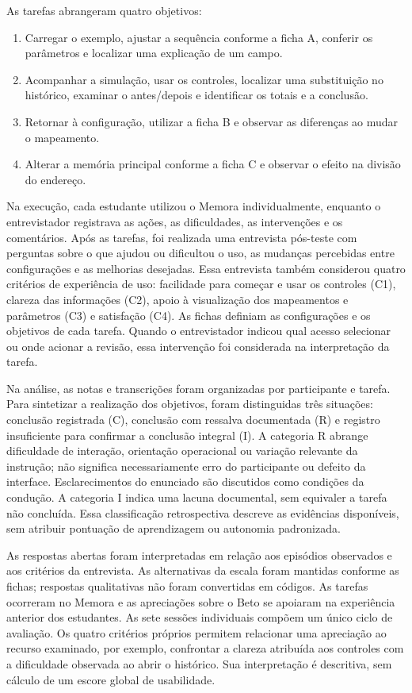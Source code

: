 As tarefas abrangeram quatro objetivos:
\begin{enumerate}
\item[\textbf{T1.}] Carregar o exemplo, ajustar a sequência conforme a ficha A, conferir os parâmetros e localizar uma explicação de um campo.
\item[\textbf{T2.}] Acompanhar a simulação, usar os controles, localizar uma substituição no histórico, examinar o antes/depois e identificar os totais e a conclusão.
\item[\textbf{T3.}] Retornar à configuração, utilizar a ficha B e observar as diferenças ao mudar o mapeamento.
\item[\textbf{T4.}] Alterar a memória principal conforme a ficha C e observar o efeito na divisão do endereço.
\end{enumerate}

Na execução, cada estudante utilizou o Memora individualmente, enquanto o entrevistador registrava as ações, as dificuldades, as intervenções e os comentários. Após as tarefas, foi realizada uma entrevista pós-teste com perguntas sobre o que ajudou ou dificultou o uso, as mudanças percebidas entre configurações e as melhorias desejadas. Essa entrevista também considerou quatro critérios de experiência de uso: facilidade para começar e usar os controles (C1), clareza das informações (C2), apoio à visualização dos mapeamentos e parâmetros (C3) e satisfação (C4). As fichas definiam as configurações e os objetivos de cada tarefa. Quando o entrevistador indicou qual acesso selecionar ou onde acionar a revisão, essa intervenção foi considerada na interpretação da tarefa.

Na análise, as notas e transcrições foram organizadas por participante e tarefa. Para sintetizar a realização dos objetivos, foram distinguidas três situações: conclusão registrada (C), conclusão com ressalva documentada (R) e registro insuficiente para confirmar a conclusão integral (I). A categoria R abrange dificuldade de interação, orientação operacional ou variação relevante da instrução; não significa necessariamente erro do participante ou defeito da interface. Esclarecimentos do enunciado são discutidos como condições da condução. A categoria I indica uma lacuna documental, sem equivaler a tarefa não concluída. Essa classificação retrospectiva descreve as evidências disponíveis, sem atribuir pontuação de aprendizagem ou autonomia padronizada.

As respostas abertas foram interpretadas em relação aos episódios observados e aos critérios da entrevista. As alternativas da escala foram mantidas conforme as fichas; respostas qualitativas não foram convertidas em códigos. As tarefas ocorreram no Memora e as apreciações sobre o Beto se apoiaram na experiência anterior dos estudantes. As sete sessões individuais compõem um único ciclo de avaliação. Os quatro critérios próprios permitem relacionar uma apreciação ao recurso examinado, por exemplo, confrontar a clareza atribuída aos controles com a dificuldade observada ao abrir o histórico. Sua interpretação é descritiva, sem cálculo de um escore global de usabilidade.

